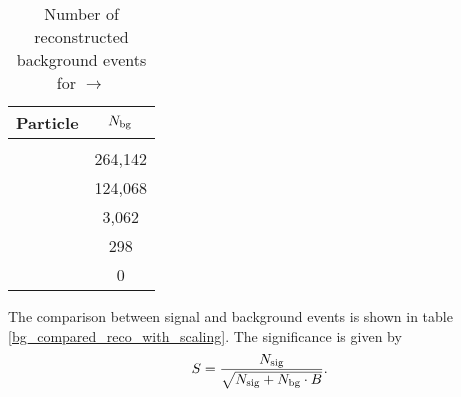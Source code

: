 \begin{table}
	\centering
	\caption{Number of reconstructed background events for \pbarpSystem $\rightarrow$ \excitedcascade \anticascade }
	\label{tab:bg_reco_without_scaling}
	\begin{tabular}{lc}
		\hline
		Particle & $N_{\textnormal{bg}}$ \\
		\hline
		\hline
		&\\
		\lam & 264,142\\
		\alam & 124,068\\
		\anticascade & 3,062\\
		\excitedcascade & 298\\
		\excitedcascade \anticascade & 0\\
		\hline
		 
		  
	\end{tabular}
\end{table}
The comparison between signal and background events is shown in table \ref{bg_compared_reco_with_scaling}.
The significance is given by
\begin{equation}
	S = \frac{N_{\textnormal{sig}}}{\sqrt{N_{\textnormal{sig}}+N_{\textnormal{bg}}\cdot B}}.
	\label{eq:significance}
\end{equation}

